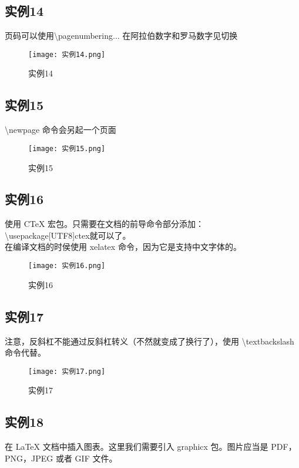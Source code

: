 \documentclass[a4paper, 12pt]{article}
\begin{document}
\subsection{实例14}
页码可以使用\textbackslash pagenumbering{...} 在阿拉伯数字和罗马数字见切换

\begin{figure}[h!]
  \centering
  \texttt{[image: 实例14.png]}
  \caption{实例14}
\end{figure}

\subsection{实例15}
\textbackslash newpage 命令会另起一个页面

\begin{figure}[h!]
  \centering
  \texttt{[image: 实例15.png]}
  \caption{实例15}
\end{figure}

\subsection{实例16}
使用 CTeX 宏包。只需要在文档的前导命令部分添加：\\
\textbackslash usepackage[UTF8]{ctex}就可以了。\\
在编译文档的时侯使用 xelatex 命令，因为它是支持中文字体的。

\begin{figure}[h!]
  \centering
  \texttt{[image: 实例16.png]}
  \caption{实例16}
\end{figure}

\subsection{实例17}
注意，反斜杠不能通过反斜杠转义（不然就变成了换行了），使用 \textbackslash textbackslash 命令代替。 

\begin{figure}[h!]
  \centering
  \texttt{[image: 实例17.png]}
  \caption{实例17}
\end{figure}

\subsection{实例18}
在 LaTeX 文档中插入图表。这里我们需要引入 graphicx 包。图片应当是 PDF，PNG，JPEG 或者 GIF 文件。
\end{document}
